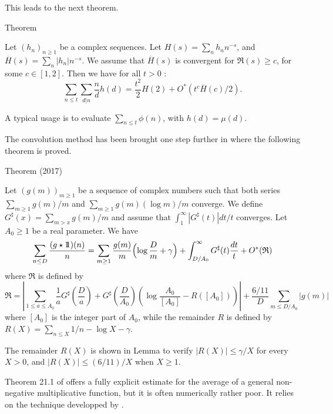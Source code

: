 This leads to the next theorem.
\begin{thm}{Theorem}

  Let $(h_n)_{n\ge1}$  be a 
complex sequences. Let $H(s)=\sum_nh_nn^{-s}$, and
$\overline{H}(s)=\sum_n|h_n|n^{-s}$.
We assume that  $\overline{H}(s)$ is convergent for
$\Re(s)\ge c$, for some $c\in[1,2]$. 
Then we have for all $t>0$ :
$$
\sum_{n\le t}\sum_{d|n}\frac{n}{d}h(d)
=
\frac{t^2}{2}H(2)+O^*(t^c\overline{H}(c)/2).
$$
\end{thm}

A typical usage is to evaluate $\sum_{n\le t}\phi(n)$, with
$h(d)=\mu(d)$.
\par 
  
The convolution method has been brought one step further in
\cite{Ramare*14-1}
where the following theorem is proved.
\par 
\begin{thm}{Theorem (2017)}

Let $(g(m))_{m\ge1}$ be a sequence of complex numbers such that both series
  $\sum_{m\ge1} g(m)/m$ and $\sum_{m\ge1} g(m)(\log m)/m$ converge. We define
  $G^\sharp(x)=\sum_{m> x} g(m)/m$ and assume that
  $\int_1^\infty |G^\sharp(t)|dt/t$ converges. Let $A_0\ge1$ be a real parameter.
  We have 
  \begin{equation*}
    \sum_{n\le D}\frac{(g\star{1\!\!1})(n)}{n}
    =\sum_{m\ge1}\frac{g(m)}{m}\Bigl(\log\frac{D}{m}+\gamma\Bigr)
    +\int_{D/A_0}^\infty G^\sharp(t)\frac{dt}{t}
    +O^*(\mathfrak{R})
  \end{equation*}
  where $\mathfrak{R}$ is defined by
  \begin{equation*}
    \mathfrak{R}
    =
    \left|\sum_{1\le a\le A_0}\frac{1}{a}G^\sharp\left(\frac{D}{a}\right)+
      G^\sharp\left(\frac{D}{A_0}\right)\left(\log\frac{A_0}{[A_0]}
        -R([A_0])\right)
    \right|
    +\frac{6/11}{D}\sum_{m\le D/A_0}|g(m)|
  \end{equation*}
  where $[A_0]$ is the integer part of $A_0$,
while the remainder $R$ is defined by
$R(X)=\sum_{n\le X}1/n-\log X-\gamma$.
\end{thm}

The remainder $R(X)$ is shown in Lemma to verify $|R(X)|\le \gamma/X$
for every $X > 0$, and $|R(X)|\le (6/11)/X$ when $X\ge1$.

\par 

Theorem 21.1 of
\cite{Ramare*06}
offers a fully explicit estimate for the average of a general non-negative
multiplicative function, but 
it is often numerically rather poor. It relies on the
technique developped by 
\cite{Levin-Fainleib*67}.


